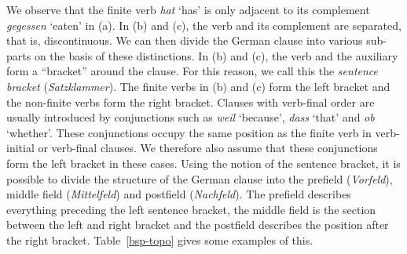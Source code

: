 We observe that the finite verb \emph{hat} `has' is only adjacent to its complement
\emph{gegessen} `eaten' in (a). In (b) and (c), the verb and its complement
are separated, that is, discontinuous. We can then divide the German clause into various sub-parts on the basis of these distinctions.
In (b) and (c), the verb and the auxiliary form a ``bracket'' around the clause. For this reason, we call this the \emph{sentence bracket} (\emph{Satzklammer}).
The finite verbs in (b) and (c) form the left bracket and the non-finite verbs form the right bracket. Clauses with verb-final order are usually introduced by conjunctions such as 
\emph{weil} `because', \emph{dass} `that' and \emph{ob} `whether'. These conjunctions occupy the same position as the finite verb in verb-initial or verb-final clauses. We therefore
also assume that these conjunctions form the left bracket in these cases. Using the notion of the sentence bracket, it is possible to divide the structure of the German clause into the 
prefield (\emph{Vorfeld}), middle field (\emph{Mittelfeld}) and postfield (\emph{Nachfeld}). The
prefield describes everything preceding the left sentence bracket, the middle field is the section
between the left and right bracket and the postfield describes the position after the right bracket.
Table~\vref{bsp-topo} gives some examples of this.
%
{}%
%
%
%
%
%
